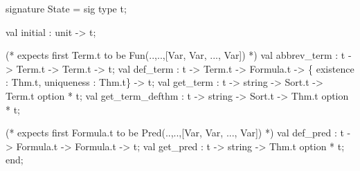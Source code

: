 \nwenddocs{}\endmoddef\nwstartdeflinemarkup\nwenddeflinemarkup
signature State = sig
  type t;

  val initial : unit -> t;

  (* expects first Term.t to be Fun(..,..,[Var, Var, ..., Var]) *)
  val abbrev_term : t -> Term.t -> Term.t -> t;
  val def_term : t -> Term.t -> Formula.t -> \{ existence : Thm.t,
                                              uniqueness : Thm.t\} -> t;
  val get_term : t -> string -> Sort.t -> Term.t option * t;
  val get_term_defthm : t -> string -> Sort.t -> Thm.t option * t;
  
  (* expects first Formula.t to be Pred(..,..,[Var, Var, ..., Var]) *)
  val def_pred : t -> Formula.t -> Formula.t -> t;
  val get_pred : t -> string -> Thm.t option * t;
end;
\nwendcode{}\nwdocspar

\nwenddocs{}

%
%
%
%
%
%

